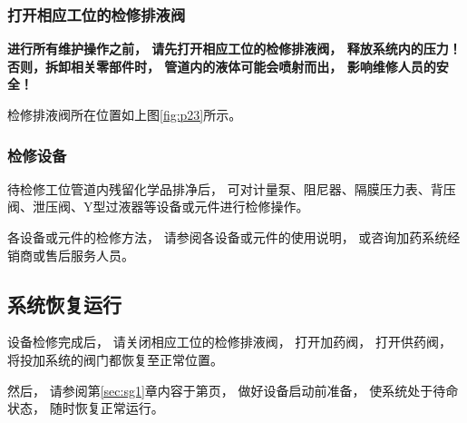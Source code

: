 \documentclass[UTF8,a4paper,12pt,titlepage]{ctexart}
\begin{document}
        \subsubsection{打开相应工位的检修排液阀}
            \large{
                \textbf{
                    进行所有维护操作之前，
                    请先打开相应工位的检修排液阀，
                    释放系统内的压力！
                    否则，拆卸相关零部件时，
                    管道内的液体可能会喷射而出，
                    影响维修人员的安全！
                }
            }

            \par\normalsize{检修排液阀所在位置如上图\ref{fig:p23}所示。}

    \subsubsection{检修设备}
        待检修工位管道内残留化学品排净后，
        可对计量泵、阻尼器、隔膜压力表、背压阀、泄压阀、Y型过液器等设备或元件进行检修操作。
        \par 各设备或元件的检修方法，
        请参阅各设备或元件的使用说明，
        或咨询加药系统经销商或售后服务人员。

        \newpage

   \subsection{系统恢复运行}
        设备检修完成后，
        请关闭相应工位的检修排液阀，
        打开加药阀，
        打开供药阀，
        将投加系统的阀门都恢复至正常位置。
        \par 然后，
        请参阅第\ref{sec:sg1}章内容于第\pageref{sec:sg1}页，
        做好设备启动前准备，
        使系统处于待命状态，
        随时恢复正常运行。
\end{document}
